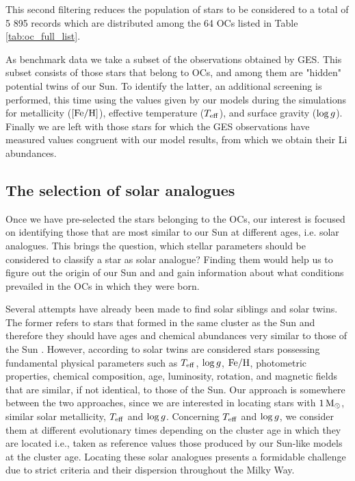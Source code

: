 \documentclass[fleqn,usenatbib]{mnras}
\begin{document}
This second filtering reduces the population of stars to be considered to a total of 5 895 records which are distributed among the 64 OCs listed in Table \ref{tab:oc_full_list}.\par

As benchmark data we take a subset of the observations obtained by GES. This subset consists of those stars that belong to OCs, and among them are "hidden" potential twins of our Sun. To identify the latter, an additional screening is performed, this time using the values given by our models during the simulations for metallicity ($[\mathrm{Fe}/\mathrm{H}]$), effective temperature ($T_{\mathrm{eff}}$), and surface gravity ($\mathrm{log} \, g$). Finally we are left with those stars for which the GES observations have measured values congruent with our model results, from which we obtain their Li abundances.\par


\subsection{The selection of solar analogues}
Once we have pre-selected the stars belonging to the OCs, our interest is focused on identifying those that are most similar to our Sun at different ages, i.e. solar analogues. This brings the question, which stellar parameters should be considered to classify a star as solar analogue? Finding them would help us to figure out the origin of our Sun and and gain information about what conditions prevailed in the OCs in which they were born.\par

Several attempts have already been made to find solar siblings and solar twins. The former refers to stars that formed in the same cluster as the Sun and therefore they should have ages and chemical abundances very similar to those of the Sun \citep[see][and references therein]{Adibekyan2018}. However, according to \citet{Strobel1996} solar twins are considered stars possessing fundamental physical parameters such as $T_{\mathrm{eff}}$, $\mathrm{log} \, g$, $\mathrm{Fe}/\mathrm{H}$, photometric properties, chemical composition, age, luminosity, rotation, and magnetic fields that are similar, if not identical, to those of the Sun. Our approach is somewhere between the two approaches, since we are interested in locating stars with $1\,\mathrm{M}_\odot$, similar solar metallicity, $T_{\mathrm{eff}}$ and $\mathrm{log} \, g$. Concerning $T_{\mathrm{eff}}$ and $\mathrm{log} \, g$, we consider them at different evolutionary times depending on the cluster age in which they are located i.e., taken as reference values those produced by our Sun-like models at the cluster age. Locating these solar analogues presents a formidable challenge due to strict criteria and their dispersion throughout the Milky Way.\par 
\end{document}
